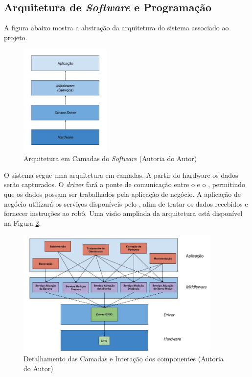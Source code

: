 \subsection{Arquitetura de \textit{Software} e Programação}
A figura abaixo mostra a abstração da arquitetura do sistema associado ao projeto.
\par
\begin{figure}[h]
  \centering
  \includegraphics[width=0.4\textwidth]{figures/schema-arch.jpg}
  \caption{Arquitetura em Camadas do \textit{Software} (\textsf{Autoria do Autor})}
  \label{fig:schema-arch}
\end{figure}
\FloatBarrier
\par
O sistema segue uma arquitetura em camadas. A partir do hardware os dados serão
capturados. O \textit{driver} fará a ponte de comunicação entre o \hardware
e o \middleware, permitindo que os dados possam ser trabalhados pela aplicação de
negócio. A aplicação de negócio utilizará os serviços disponíveis pelo \middleware,
afim de tratar os dados recebidos e fornecer instruções ao robô. Uma visão
ampliada da arquitetura está disponível na Figura \ref{fig:schema-layer-arch}.
\par
\begin{figure}[h]
  \centering
  \includegraphics[width=0.9\textwidth]{figures/schema-layer-arch.jpg}
  \caption{Detalhamento das Camadas e Interação dos componentes (\textsf{Autoria do Autor})}
  \label{fig:schema-layer-arch}
\end{figure}
